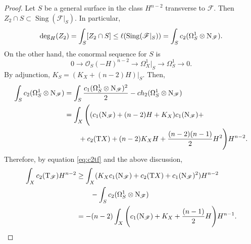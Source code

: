 \documentclass[a4paper, 11pt]{amsart}
\theoremstyle{plain}
\numberwithin{theorem}{section}
\theoremstyle{definition}
\DeclareMathOperator{\sing}{Sing}
\newcommand{\OS}{\mathcal{O}_S}
\newcommand{\lra}{\longrightarrow}
\newcommand{\sF}{\mathscr{F}}
\newcommand{\tF}{{\rm T}_\mathscr{F}}
\newcommand{\nF}{{\rm N}_\mathscr{F}}
\newcommand{\tX}{{\rm T}X}
\begin{document}
\begin{proof}
Let $S$ be a general surface in the class $H^{n-2}$ transverse to $\sF$. Then $Z_2\cap S \subset \sing(\sF|_S)$. In particular,
\[
\deg_H(Z_2) = \int_S [Z_2 \cap S] \leq \ell(\sing(\sF|_S)) = \int_S c_2(\Omega^1_S\otimes \nF).   
\]
On the other hand, the conormal sequence for $S$ is 
\[
0 \lra \OS(-H)^{n-2} \lra \Omega_X^1|_S \lra \Omega_S^1 \lra 0 .
\]
By adjunction, $K_S = (K_X + (n-2)H)|_S$.  Then,
{
\begin{align*}
    \int_S c_2(\Omega_S^1\otimes \nF) & = \int_S \frac{c_1(\Omega_S^1\otimes \nF)^2}{2} - ch_2(\Omega_S^1\otimes \nF) \\
    &  = \int_X \Bigg((c_1(\nF) +  (n-2) H + K_X)c_1(\nF) +  \\ & \qquad +c_2(\tX) + (n-2) K_X H +\frac{(n-2)(n-1) }{2} H^2\Bigg)H^{n-2}  . 
\end{align*}
}
Therefore, by equation \eqref{eq:c2tf} and the above discussion,
{
\begin{align*}
   \int_X c_2(\tF)H^{n-2} &\geq \int_X (K_X c_1(\nF)+ c_2(\tX) + c_1(\nF)^2 )H^{n-2} \\ & \qquad -\int_S c_2(\Omega_S^1\otimes \nF) \\
  &= -(n-2)\int_X \Bigg(  c_1(\nF) +K_X +\frac{(n-1) }{2} H\Bigg)H^{n-1} .
\end{align*}
}
\end{proof}
\end{document}
